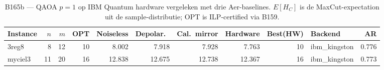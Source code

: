 \begin{table}[t]
\centering
\small
\caption{B165b --- QAOA $p=1$ op IBM Quantum hardware vergeleken met drie Aer-baselines. $E[H_C]$ is de MaxCut-expectation uit de sample-distributie; OPT is ILP-certified via B159.}
\label{tab:b165b-hardware}
\begin{tabular}{l r r r r r r r r l r}
\toprule
Instance & $n$ & $m$ & OPT & Noiseless & Depolar.\ & Cal.\ mirror & Hardware & Best(HW) & Backend & AR \\
\midrule
3reg8 & 8 & 12 & 10 & 8.002 & 7.918 & 7.928 & 7.763 & 10 & ibm_kingston & 0.776 \\
myciel3 & 11 & 20 & 16 & 12.838 & 12.675 & 12.738 & 12.367 & 16 & ibm_kingston & 0.773 \\
\bottomrule
\end{tabular}
\end{table}
